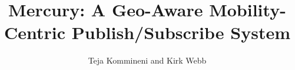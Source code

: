 \documentclass[letterpaper,twocolumn,10pt]{article}
\title{Mercury: A Geo-Aware Mobility-Centric Publish/Subscribe System}
\author{Teja Kommineni and Kirk Webb}
\affil{School of Computing, University of Utah}
\begin{document}
\maketitle









{
  \small 
  
  
}
\end{document}
